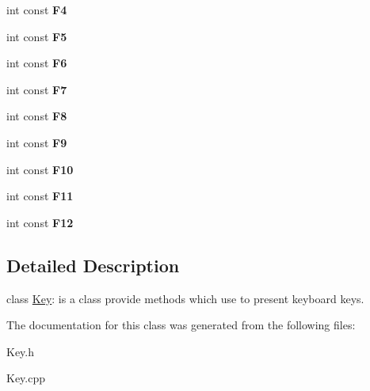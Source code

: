 \begin{DoxyCompactItemize}
\item 
\hypertarget{group__group12_ga602dc5b0152db3f98e17590524821be2}{
int const {\bfseries F4}}
\label{group__group12_ga602dc5b0152db3f98e17590524821be2}

\item 
\hypertarget{group__group12_ga03dfaa07bd45140d0d463b4f63ee50e0}{
int const {\bfseries F5}}
\label{group__group12_ga03dfaa07bd45140d0d463b4f63ee50e0}

\item 
\hypertarget{group__group12_ga16949ba7bd28d03b288286786f47da2f}{
int const {\bfseries F6}}
\label{group__group12_ga16949ba7bd28d03b288286786f47da2f}

\item 
\hypertarget{group__group12_gace41caca76f3d8d554ec1b039fbf3f76}{
int const {\bfseries F7}}
\label{group__group12_gace41caca76f3d8d554ec1b039fbf3f76}

\item 
\hypertarget{group__group12_gaf9e7ff8a44a64a5507a4fc06f7fd4ee2}{
int const {\bfseries F8}}
\label{group__group12_gaf9e7ff8a44a64a5507a4fc06f7fd4ee2}

\item 
\hypertarget{group__group12_ga68ac93381ba2b32f8679deb9fff8fff3}{
int const {\bfseries F9}}
\label{group__group12_ga68ac93381ba2b32f8679deb9fff8fff3}

\item 
\hypertarget{group__group12_gade873a7768f616f8de2301a8286f380f}{
int const {\bfseries F10}}
\label{group__group12_gade873a7768f616f8de2301a8286f380f}

\item 
\hypertarget{group__group12_ga0815c903a15744ca2aa4be622098c869}{
int const {\bfseries F11}}
\label{group__group12_ga0815c903a15744ca2aa4be622098c869}

\item 
\hypertarget{group__group12_ga91c0243c487026282a1bd5a05585967a}{
int const {\bfseries F12}}
\label{group__group12_ga91c0243c487026282a1bd5a05585967a}

\end{DoxyCompactItemize}


\subsection{Detailed Description}
class \hyperlink{class_key}{Key}: is a class provide methods which use to present keyboard keys. 

The documentation for this class was generated from the following files:\begin{DoxyCompactItemize}
\item 
Key.h\item 
Key.cpp\end{DoxyCompactItemize}
